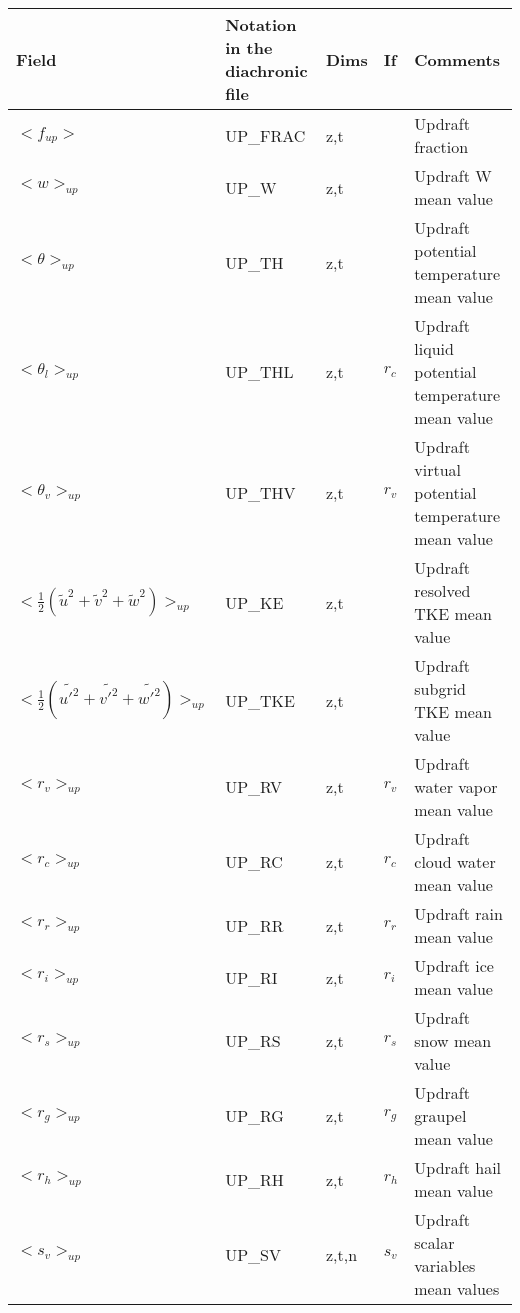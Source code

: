 \begingroup
\renewcommand\arraystretch{1.5}
\begin{longtable}[c]{|p{}|p{}|p{}|p{}|p{}|}
\hline
Field & Notation in the diachronic file & Dims & If  & Comments \\
\hline \hline
\endhead
$<f_{up}>$                                    & UP\_FRAC  & z,t   &       & Updraft fraction \\\hline
$<w>_{up}$                                    & UP\_W     & z,t   &       & Updraft W mean value \\\hline
$<\theta>_{up}$                               & UP\_TH    & z,t   &       & Updraft potential temperature mean value \\\hline
$<\theta_l>_{up}$                             & UP\_THL   & z,t   & $r_c$ & Updraft liquid potential temperature mean value \\\hline
$<\theta_v>_{up}$                             & UP\_THV   & z,t   & $r_v$ & Updraft virtual potential temperature mean value \\\hline
$<\frac{1}{2}(\tilde{u}^2+\tilde{v}^2+\tilde{w}^2)>_{up}$ & UP\_KE & z,t & & Updraft resolved TKE mean value \\\hline
$<\frac{1}{2}(\tilde{u'^2}+\tilde{v'^2}+\tilde{w'^2})>_{up}$ & UP\_TKE & z,t & & Updraft subgrid TKE mean value \\\hline
$<r_v>_{up}$                                  & UP\_RV    & z,t   & $r_v$ & Updraft water vapor mean value \\\hline
$<r_c>_{up}$                                  & UP\_RC    & z,t   & $r_c$ & Updraft cloud water mean value \\\hline
$<r_r>_{up}$                                  & UP\_RR    & z,t   & $r_r$ & Updraft rain mean value \\\hline
$<r_i>_{up}$                                  & UP\_RI    & z,t   & $r_i$ & Updraft ice mean value \\\hline
$<r_s>_{up}$                                  & UP\_RS    & z,t   & $r_s$ & Updraft snow mean value \\\hline
$<r_g>_{up}$                                  & UP\_RG    & z,t   & $r_g$ & Updraft graupel mean value \\\hline
$<r_h>_{up}$                                  & UP\_RH    & z,t   & $r_h$ & Updraft hail mean value \\\hline
$<s_v>_{up}$                                  & UP\_SV    & z,t,n & $s_v$ & Updraft scalar variables mean values \\\hline

\end{longtable}
